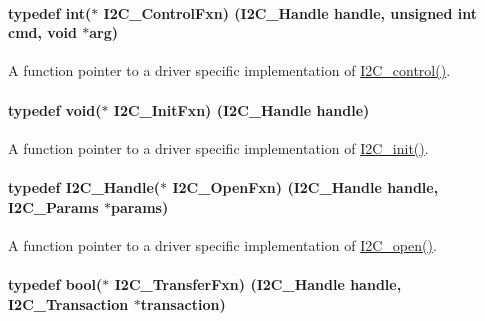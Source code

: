 \paragraph[{I2\+C\+\_\+\+Control\+Fxn}]{\setlength{\rightskip}{0pt plus 5cm}typedef int($\ast$ I2\+C\+\_\+\+Control\+Fxn) ({\bf I2\+C\+\_\+\+Handle} handle, unsigned int cmd, void $\ast$arg)}\label{_i2_c_8h_a4b15853f98d3d5e5135b8c52b8465fff}


A function pointer to a driver specific implementation of \hyperlink{_i2_c_8h_a633003582213a5098467a4e647cc52f9}{I2\+C\+\_\+control()}. 

\paragraph[{I2\+C\+\_\+\+Init\+Fxn}]{\setlength{\rightskip}{0pt plus 5cm}typedef void($\ast$ I2\+C\+\_\+\+Init\+Fxn) ({\bf I2\+C\+\_\+\+Handle} handle)}\label{_i2_c_8h_adfb2451c8a1ce70402e43e4743c5fedf}


A function pointer to a driver specific implementation of \hyperlink{_i2_c_8h_a9ff51ddf1d325776fef90cce0223772b}{I2\+C\+\_\+init()}. 

\paragraph[{I2\+C\+\_\+\+Open\+Fxn}]{\setlength{\rightskip}{0pt plus 5cm}typedef {\bf I2\+C\+\_\+\+Handle}($\ast$ I2\+C\+\_\+\+Open\+Fxn) ({\bf I2\+C\+\_\+\+Handle} handle, {\bf I2\+C\+\_\+\+Params} $\ast$params)}\label{_i2_c_8h_add24fcdaaf1bdef1521ce2489bf1d80e}


A function pointer to a driver specific implementation of \hyperlink{_i2_c_8h_ae1aa99e1fee4517406018e10025cca0e}{I2\+C\+\_\+open()}. 

\paragraph[{I2\+C\+\_\+\+Transfer\+Fxn}]{\setlength{\rightskip}{0pt plus 5cm}typedef bool($\ast$ I2\+C\+\_\+\+Transfer\+Fxn) ({\bf I2\+C\+\_\+\+Handle} handle, {\bf I2\+C\+\_\+\+Transaction} $\ast$transaction)}\label{_i2_c_8h_aa785484e689c79262f98208689fecd38}


